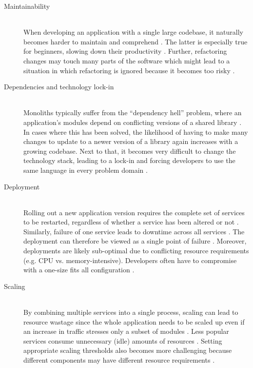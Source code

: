 \begin{description}
  \item[Maintainability]
  \hfill \\
  When developing an application with a single large codebase, it naturally becomes harder to maintain and comprehend \cite[p.~2]{dragoni2017microservices}. The latter is especially true for beginners, slowing down their productivity \cite[p.~24]{dmitry2014micro}. Further, refactoring changes may touch many parts of the software which might lead to a situation in which refactoring is ignored because it becomes too risky \cite[p.~35]{kalske2017challenges}.

 \item[Dependencies and technology lock-in]
  \hfill \\
  Monoliths typically suffer from the \enquote{dependency hell} problem, where an application's modules depend on conflicting versions of a shared library \cite[p.~2]{dragoni2017microservices}. In cases where this has been solved, the likelihood of having to make many changes to update to a newer version of a library again increases with a growing codebase. Next to that, it becomes very difficult to change the technology stack, leading to a lock-in and forcing developers to use the same language in every problem domain \cite[p.~24]{dmitry2014micro} \cite[p.~2]{dragoni2017microservices}.

  \item[Deployment]
  \hfill \\
  Rolling out a new application version requires the complete set of services to be restarted, regardless of whether a service has been altered or not \cite[p.~2]{dragoni2017microservices}. Similarly, failure of one service leads to downtime across all services \cite[p.~970]{vayghan2018deploying}. The deployment can therefore be viewed as a single point of failure \cite[p.~584]{villamizar2015evaluating}. Moreover, deployments are likely sub-optimal due to conflicting resource requirements (e.g. \acs{CPU} vs. memory-intensive). Developers often have to compromise with a one-size fits all configuration \cite[p.~2]{dragoni2017microservices}.

  \item[Scaling]
  \hfill \\
  By combining multiple services into a single process, scaling can lead to resource wastage since the whole application needs to be scaled up even if an increase in traffic stresses only a subset of modules \cite[p.~850]{singh2017container} \cite[p.~2]{dragoni2017microservices}. Less popular services consume unnecessary (idle) amounts of resources \cite[p.~584]{villamizar2015evaluating}. Setting appropriate scaling thresholds also becomes more challenging because different components may have different resource requirements \cite[p.~24]{dmitry2014micro}.
\end{description}

